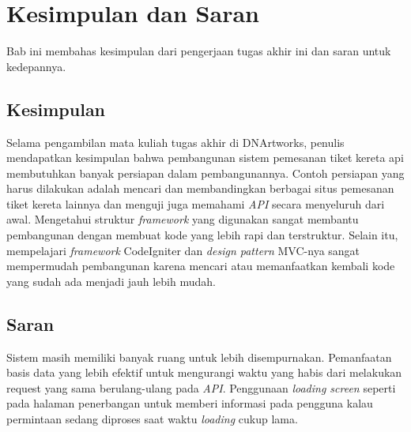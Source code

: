 \chapter{Kesimpulan dan Saran}
\label{chap:kesimpulan}
Bab ini membahas kesimpulan dari pengerjaan tugas akhir ini dan saran untuk kedepannya.

\section{Kesimpulan}
\label{sec:kesimpulan} 
Selama pengambilan mata kuliah tugas akhir di DNArtworks, penulis mendapatkan kesimpulan bahwa pembangunan sistem pemesanan tiket kereta api membutuhkan banyak persiapan dalam pembangunannya. Contoh persiapan yang harus dilakukan adalah mencari dan membandingkan berbagai situs pemesanan tiket kereta lainnya dan menguji juga memahami \textit{API} secara menyeluruh dari awal. Mengetahui struktur \textit{framework} yang digunakan sangat membantu pembangunan dengan membuat kode yang lebih rapi dan terstruktur. Selain itu, mempelajari \textit{framework} CodeIgniter dan \textit{design pattern} MVC-nya sangat mempermudah pembangunan karena mencari atau memanfaatkan kembali kode yang sudah ada menjadi jauh lebih mudah.

\section{Saran}
\label{sec:saran}
Sistem masih memiliki banyak ruang untuk lebih disempurnakan. Pemanfaatan basis data yang lebih efektif untuk mengurangi waktu yang habis dari melakukan request yang sama berulang-ulang pada \textit{API}. Penggunaan \textit{loading screen} seperti pada halaman penerbangan untuk memberi informasi pada pengguna kalau permintaan sedang diproses saat waktu \textit{loading} cukup lama.

